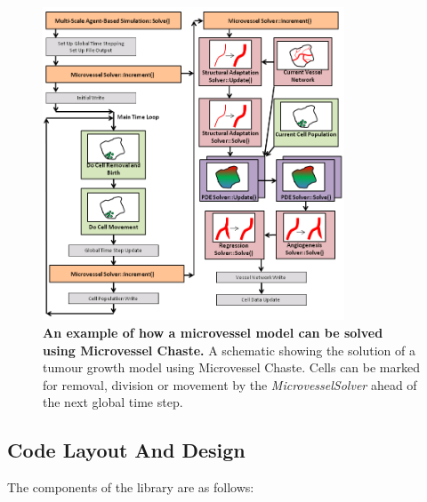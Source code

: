 \documentclass[10pt,letterpaper]{article}
\begin{document}
\begin{figure}[!h]
\centering
\includegraphics[width=0.8\textwidth]{Fig2.png}
\caption{{\bf An example of how a microvessel model can be solved using Microvessel Chaste.}
A schematic showing the solution of a tumour growth model using Microvessel Chaste. Cells can be marked for removal, division or movement by the \textit{MicrovesselSolver} ahead of the next global time step.}
\label{fig2}
\end{figure}

\subsection*{Code Layout And Design}

The components of the library are as follows:
\end{document}
